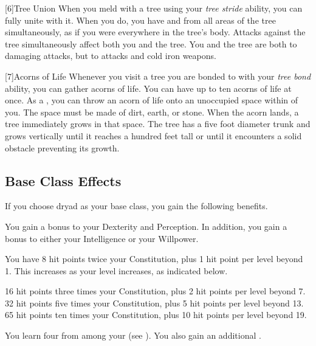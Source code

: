     [6]{Tree Union} When you meld with a tree using your \textit{tree stride} ability, you can fully unite with it.
      When you do, you have  and  from all areas of the tree simultaneously, as if you were everywhere in the tree's body.
      Attacks against the tree simultaneously affect both you and the tree.
      You and the tree are both \impervious to damaging attacks, but \vulnerable to \atFire attacks and cold iron weapons.

    [7]{Acorns of Life} Whenever you visit a tree you are bonded to with your \textit{tree bond} ability, you can gather acorns of life.
      You can have up to ten acorns of life at once.
      As a , you can throw an acorn of life onto an unoccupied  space within \medrange of you.
      The space must be made of dirt, earth, or stone.
      When the acorn lands, a tree immediately grows in that space.
      The tree has a five foot diameter trunk and grows vertically until it reaches a hundred feet tall or until it encounters a solid obstacle preventing its growth.

  \subsection{Base Class Effects}
    If you choose dryad as your base class, you gain the following benefits.

      You gain a  bonus to your Dexterity and Perception. In addition, you gain a  bonus to either your Intelligence or your Willpower.

      You have 8 hit points \add twice your Constitution, plus 1 hit point per level beyond 1.
      This increases as your level increases, as indicated below.
      \begin{itemize}
         16 hit points \add three times your Constitution, plus 2 hit points per level beyond 7.
         32 hit points \add five times your Constitution, plus 5 hit points per level beyond 13.
         65 hit points \add ten times your Constitution, plus 10 hit points per level beyond 19.
      \end{itemize}

      You learn four  from among your  (see ). You also gain an additional .

